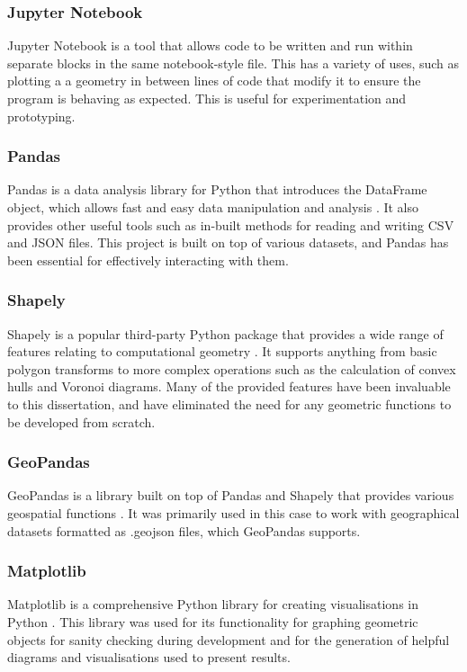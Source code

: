 \documentclass{article}
\begin{document}
\subsubsection{Jupyter Notebook}
Jupyter Notebook is a tool that allows code to be written and run within separate blocks in the same notebook-style file. This has a variety of uses, such as plotting a a geometry in between
lines of code that modify it to ensure the program is behaving as expected. This is useful for experimentation and prototyping.

\subsubsection{Pandas}
Pandas is a data analysis library for Python that introduces the DataFrame object, which allows fast and easy data manipulation and analysis \cite{pandas}. It also provides other useful tools such as in-built
methods for reading and writing CSV and JSON files. This project is built on top of various datasets, and Pandas has been essential for effectively interacting with them.

\subsubsection{Shapely}
Shapely is a popular third-party Python package that provides a wide range of features relating to computational geometry \cite{shapely}. It supports anything from basic polygon transforms to more complex
operations such as the calculation of convex hulls and Voronoi diagrams. Many of the provided features have been invaluable to this dissertation, and have eliminated the need for any
geometric functions to be developed from scratch.

\subsubsection{GeoPandas}
GeoPandas is a library built on top of Pandas and Shapely that provides various geospatial functions \cite{kelsey_jordahl_2020_3946761}. It was primarily used in this case to work with geographical datasets formatted
as .geojson files, which GeoPandas supports.

\subsubsection{Matplotlib}
Matplotlib is a comprehensive Python library for creating visualisations in Python \cite{matplotlib}. This library was used for its functionality for graphing geometric objects for sanity checking during 
development and for the generation of helpful diagrams and visualisations used to present results.
\end{document}
